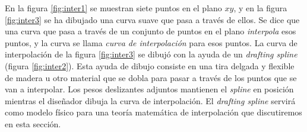 En la figura \ref{fig:inter1} se muestran siete puntos en el plano $xy$, y en la figura \ref{fig:inter3} se ha dibujado una curva suave que pasa a través de ellos. Se dice que una curva que pasa a través de un conjunto de puntos en el plano \emph{interpola} esos puntos, y la curva se llama \emph{curva de interpolación} para esos puntos. La curva de interpolación de la figura \ref{fig:inter3} se dibujó con la ayuda de un \emph{drafting spline} (figura \ref{fig:inter2}). Esta ayuda de dibujo consiste en una tira delgada y flexible de madera u otro material que se dobla para pasar a través de los puntos que se van a interpolar. Los pesos deslizantes adjuntos mantienen el \emph{spline} en posición mientras el diseñador dibuja la curva de interpolación. El \emph{drafting spline} servirá como modelo físico para una teoría matemática de interpolación que discutiremos en esta sección.
